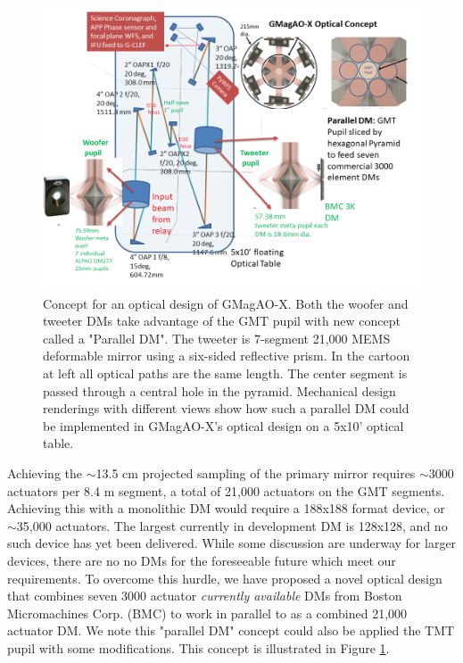 \documentclass[12pt,preprint]{aastex}
\begin{document}
\begin{figure} [h!]
\centering
\includegraphics[width=6in]{figures/Possible_Optical_design_GMagAOX_V2.png}
\caption{ Concept for an optical design of GMagAO-X. Both the woofer and tweeter DMs take advantage of the GMT pupil with new concept called a "Parallel DM". The tweeter is 7-segment 21,000 MEMS deformable mirror using a six-sided reflective prism.  In the cartoon at left all optical paths are the same length. The center segment is passed through a central hole in the pyramid. Mechanical design renderings with different views show how such a parallel DM could be implemented in GMagAO-X's optical design on a 5x10' optical table.  \label{fig:pardm}}
\end{figure}

Achieving the $\sim$13.5 cm projected sampling of the primary mirror requires $\sim$3000 actuators per 8.4 m segment, a total of 21,000 actuators on the GMT segments.   Achieving this with a monolithic DM would require a 188x188 format device, or $\sim$35,000 actuators. The largest currently in development DM is 128x128, and no such device has yet been delivered.  While some discussion are underway for larger devices, there are no no DMs for the foreseeable future which meet our requirements. To overcome this hurdle, we have proposed a novel optical design that combines seven 3000 actuator \textit{currently available} DMs from Boston Micromachines Corp. (BMC) to work in parallel to as a combined 21,000 actuator DM. We note this "parallel DM" concept could also be applied the TMT pupil with some modifications.  This concept is illustrated in Figure \ref{fig:pardm}.
\end{document}
